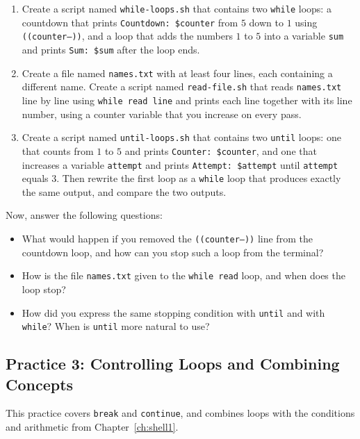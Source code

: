 \begin{enumerate}
    \item Create a script named \texttt{while-loops.sh} that contains two \texttt{while} loops: a countdown that prints \texttt{Countdown: \$counter} from $5$ down to $1$ using \texttt{((counter--))}, and a loop that adds the numbers $1$ to $5$ into a variable \texttt{sum} and prints \texttt{Sum: \$sum} after the loop ends.
    \item Create a file named \texttt{names.txt} with at least four lines, each containing a different name. Create a script named \texttt{read-file.sh} that reads \texttt{names.txt} line by line using \texttt{while read line} and prints each line together with its line number, using a counter variable that you increase on every pass.
    \item Create a script named \texttt{until-loops.sh} that contains two \texttt{until} loops: one that counts from $1$ to $5$ and prints \texttt{Counter: \$counter}, and one that increases a variable \texttt{attempt} and prints \texttt{Attempt: \$attempt} until \texttt{attempt} equals $3$. Then rewrite the first loop as a \texttt{while} loop that produces exactly the same output, and compare the two outputs.
\end{enumerate}

Now, answer the following questions:
\begin{itemize}
    \item What would happen if you removed the \texttt{((counter--))} line from the countdown loop, and how can you stop such a loop from the terminal?
    \item How is the file \texttt{names.txt} given to the \texttt{while read} loop, and when does the loop stop?
    \item How did you express the same stopping condition with \texttt{until} and with \texttt{while}? When is \texttt{until} more natural to use?
\end{itemize}

\subsection{Practice 3: Controlling Loops and Combining Concepts}
This practice covers \texttt{break} and \texttt{continue}, and combines loops with the conditions and arithmetic from Chapter~\ref{ch:shell1}.

